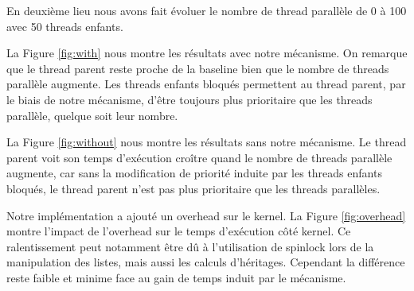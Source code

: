 \newpage

En deuxième lieu nous avons fait évoluer le nombre de thread parallèle de 0 à 100 avec 50 threads enfants.

La Figure \ref{fig:with} nous montre les résultats avec notre mécanisme. On remarque que le thread parent 
reste proche de la baseline bien que le nombre de threads parallèle augmente. Les threads enfants bloqués permettent au
thread parent, par le biais de notre mécanisme, d'être toujours plus prioritaire que les threads parallèle, quelque soit leur nombre.

La Figure \ref{fig:without} nous montre les résultats sans notre mécanisme. Le thread parent voit son temps d'exécution
croître quand le nombre de threads parallèle augmente, car sans la modification de priorité induite par les threads
enfants bloqués, le thread parent n'est pas plus prioritaire que les threads parallèles.

Notre implémentation a ajouté un overhead sur le kernel. La Figure \ref{fig:overhead} montre l'impact de
l'overhead sur le temps d'exécution côté kernel. Ce ralentissement peut notamment être dû à l'utilisation de
spinlock lors de la manipulation des listes, mais aussi les calculs d'héritages. Cependant la différence reste
faible et minime face au gain de temps induit par le mécanisme.


